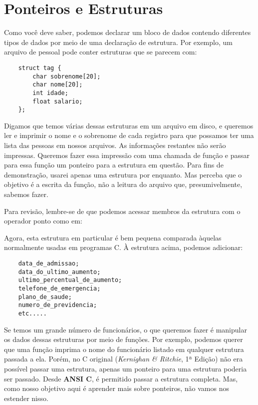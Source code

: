 
\chapter{Ponteiros e Estruturas}
Como você deve saber, podemos declarar um bloco de dados contendo diferentes tipos de dados por meio de uma declaração de estrutura. Por exemplo, um arquivo de pessoal pode conter estruturas que se parecem com:
\begin{lstlisting}
	struct tag {
		char sobrenome[20];
		char nome[20];
		int idade;
		float salario;
	};
\end{lstlisting}

Digamos que temos várias dessas estruturas em um arquivo em disco, e queremos ler e imprimir o nome e o sobrenome de cada registro para que possamos ter uma lista das pessoas em nossos arquivos. As informações restantes não serão impressas. Queremos fazer essa impressão com uma chamada de função e passar para essa função um ponteiro para a estrutura em questão. Para fins de demonstração, usarei apenas uma estrutura por enquanto. Mas perceba que o objetivo é a escrita da função, não a leitura do arquivo que, presumivelmente, sabemos fazer.

Para revisão, lembre-se de que podemos acessar membros da estrutura com o operador ponto como em:


Agora, esta estrutura em particular é bem pequena comparada àquelas normalmente usadas em programas C. À estrutura acima, podemos adicionar:
\begin{lstlisting}
	data_de_admissao;
	data_do_ultimo_aumento;
	ultimo_percentual_de_aumento;
	telefone_de_emergencia;
	plano_de_saude;
	numero_de_previdencia;
	etc.....
\end{lstlisting}

Se temos um grande número de funcionários, o que queremos fazer é manipular os dados dessas estruturas por meio de funções. Por exemplo, podemos querer que uma função imprima o nome do funcionário listado em qualquer estrutura passada a ela. Porém, no C original (\textit{Kernighan \& Ritchie}, 1ª Edição) não era possível passar uma estrutura, apenas um ponteiro para uma estrutura poderia ser passado. Desde \textbf{ANSI C}, é permitido passar a estrutura completa. Mas, como nosso objetivo aqui é aprender mais sobre ponteiros, não vamos nos estender nisso.

